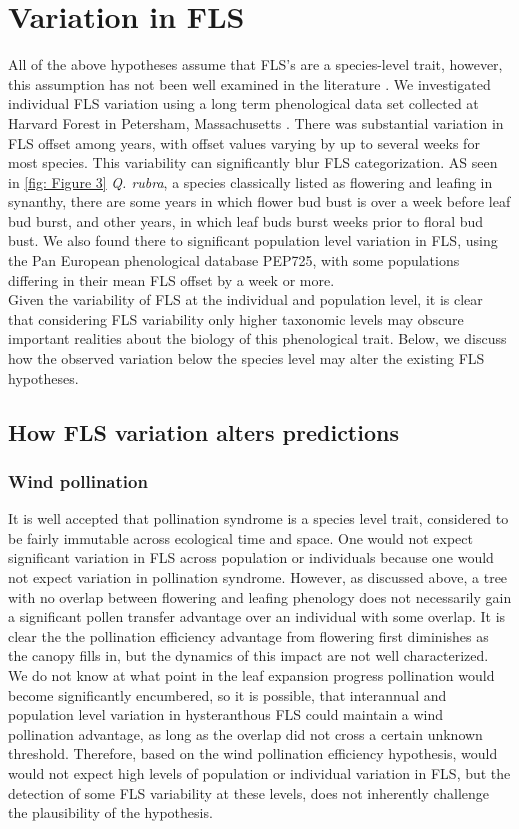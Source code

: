 \documentclass[12pt]{article}\usepackage[]{graphicx}\usepackage[]{color}
\begin{document}
\section*{Variation in FLS}
 \indent\indent All of the above hypotheses assume that FLS's are a species-level trait, however, this assumption has not been well examined in the literature \citep{Gougherty2018}.%
 We investigated individual FLS variation using a long term phenological data set collected at Harvard Forest in Petersham, Massachusetts \citep{OKeefe2015}. There was substantial variation in FLS offset among years, with offset values varying by up to several weeks for most species.  This variability  can significantly blur FLS categorization. AS seen in \ref{fig: Figure 3} \textit{Q. rubra}, a species classically listed as flowering and leafing in synanthy, there are some years in which flower bud bust is over a week before leaf bud burst, and other years, in which leaf buds burst weeks prior to floral bud bust. We also found there to significant population level variation in FLS, using the Pan European phenological database PEP725\citep{PEP725}, with some populations differing in their mean FLS offset by a week or more.\\
\indent Given the variability of FLS at the individual and population level, it is clear that considering FLS variability only higher taxonomic levels may obscure important realities about the biology of this phenological trait. Below, we discuss how the observed variation below the species level may alter the existing FLS hypotheses.

\subsection*{How FLS variation alters predictions}
\subsubsection*{Wind pollination} 
\indent\indent It is well accepted that pollination syndrome is a species level trait, considered to be fairly immutable across ecological time and space. One would not expect significant variation in FLS across population or individuals because one would not expect variation in pollination syndrome. However, as discussed above, a tree with no overlap between flowering and leafing phenology does not necessarily gain a significant pollen transfer advantage over an individual with some overlap. It is clear the the pollination efficiency advantage from flowering first diminishes as the canopy fills in, but the dynamics of this impact are not well characterized. We do not know at what point in the leaf expansion progress pollination would become significantly encumbered, so it is possible, that interannual and population level variation in hysteranthous FLS could maintain a wind pollination advantage, as long as the overlap did not cross a certain unknown threshold. Therefore, based on the wind pollination efficiency hypothesis, would would not expect high levels of population or individual variation in FLS, but the detection of some FLS variability at these levels, does not inherently challenge the plausibility of the hypothesis. %
\end{document}

